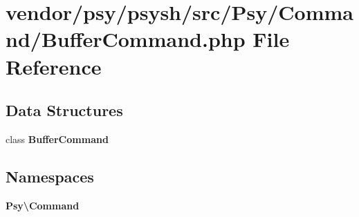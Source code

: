 \section{vendor/psy/psysh/src/\+Psy/\+Command/\+Buffer\+Command.php File Reference}
\label{_buffer_command_8php}
\subsection*{Data Structures}
\begin{DoxyCompactItemize}
\item 
class {\bf Buffer\+Command}
\end{DoxyCompactItemize}
\subsection*{Namespaces}
\begin{DoxyCompactItemize}
\item 
 {\bf Psy\textbackslash{}\+Command}
\end{DoxyCompactItemize}
